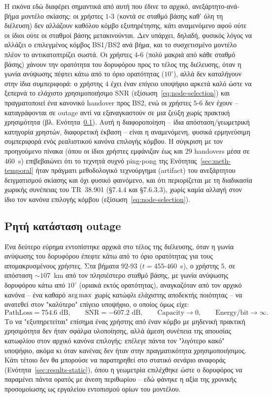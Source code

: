 Η εικόνα εδώ διαφέρει σημαντικά από αυτή που έδινε το αρχικό,
ανεξάρτητο-ανά-βήμα μοντέλο σκίασης: οι χρήστες $1$-$3$ (κοντά σε σταθμό
βάσης καθ' όλη τη διέλευση) δεν αλλάζουν καθόλου κόμβο εξυπηρέτησης, κάτι
αναμενόμενο αφού ούτε οι ίδιοι ούτε οι σταθμοί βάσης μετακινούνται. Δεν
υπάρχει, δηλαδή, φυσικός λόγος να αλλάζει ο επιλεγμένος κόμβος BS1/BS2 ανά βήμα, και
το συσχετισμένο μοντέλο πλέον το αντικατοπτρίζει σωστά. Οι χρήστες $4$-$6$
(πολύ μακριά από κάθε σταθμό βάσης) χάνουν την ορατότητα του δορυφόρου
προς το τέλος της διέλευσης, όταν η γωνία ανύψωσης πέφτει κάτω από το όριο
ορατότητας ($10^\circ$), αλλά δεν καταλήγουν στην ίδια συμπεριφορά: ο
χρήστης $4$ έχει έναν επίγειο υποψήφιο αρκετά καλό ώστε να ξεπερνά το
ελάχιστο χρησιμοποιήσιμο SNR (εξίσωση~\eqref{eq:node-selection}) και
πραγματοποιεί ένα κανονικό handover προς BS2, ενώ οι χρήστες $5$-$6$ δεν
έχουν -- καταγράφονται σε outage αντί να εξαναγκαστούν σε μια ζεύξη χωρίς
πρακτική χρησιμότητα (βλ. Ενότητα~\ref{subsec:results-outage}). Αυτή η
διαφοροποίηση -- ίδια απόσταση/γεωμετρική κατηγορία χρηστών, διαφορετική
έκβαση -- είναι η αναμενόμενη, φυσικά ερμηνεύσιμη συμπεριφορά ενός
ρεαλιστικού κανόνα επιλογής κόμβου. Η σύγκριση με τον προηγούμενο
πίνακα (όπου οι ίδιοι χρήστες εμφάνιζαν έως και $29$ handovers μέσα σε
$460$~s) επιβεβαιώνει ότι το τεχνητά συχνό ping-pong της
Ενότητας~\ref{sec:meth-temporal} ήταν πράγματι μεθοδολογικό τεχνούργημα
(artifact) του ανεξάρτητου δειγματισμού σκίασης και όχι φυσικό φαινόμενο,
και ότι περιορίζεται με τη διαδικασία χωρικής συνέπειας του TR~38.901
(§7.4.4 και §7.6.3.3), χωρίς καμία αλλαγή στον ίδιο τον κανόνα επιλογής
κόμβου (εξίσωση~\eqref{eq:node-selection}).

\subsection{Ρητή κατάσταση outage}
\label{subsec:results-outage}

Ένα δεύτερο εύρημα εντοπίστηκε αρχικά στο τέλος της διέλευσης, όταν η
γωνία ανύψωσης του δορυφόρου έπεφτε κάτω από το όριο ορατότητας για τους
απομακρυσμένους χρήστες. Στα βήματα $92$-$93$ ($t = 455$-$460$~s), ο
χρήστης $5$, σε απόσταση $\sim\!107$~km από τον πλησιέστερο σταθμό
βάσης, με γωνία ανύψωσης δορυφόρου κάτω από $10^\circ$ (οριακά εκτός
ορατότητας), αναγκαζόταν από τον αρχικό κανόνα -- ένα καθαρό $\operatorname*{arg\,max}$
χωρίς κατώφλι ελάχιστης αποδεκτής ποιότητας -- να ανατεθεί στον
"καλύτερο" επίγειο υποψήφιο, ο οποίος όμως είχε:
\[
\text{PathLoss} = 754.6\text{~dB}, \qquad \text{SNR} = -607.2\text{~dB},
\qquad \text{Capacity} \to 0, \qquad \text{Energy/bit} \to \infty.
\]
Το να "εξυπηρετείται" επίσημα ένας χρήστης από έναν κόμβο με μηδενική
πρακτική χρησιμότητα δεν ήταν σφάλμα υλοποίησης, αλλά άμεση συνέπεια της
απουσίας κατωφλίου στον αρχικό κανόνα επιλογής: επέλεγε πάντα τον
"λιγότερο κακό" υποψήφιο, ακόμα κι όταν κανένας δεν ήταν στην
πραγματικότητα χρησιμοποιήσιμος. Κάτι τέτοιο δεν θα μπορούσε να
παρατηρηθεί στο στατικό σενάριο αναφοράς (Ενότητα~\ref{sec:results-static}),
όπου η γεωμετρία επιλέχθηκε ώστε ο δορυφόρος να παραμένει πάντα ορατός με
άνεση περιθωρίου -- εδώ φάνηκε η αξία της χρονικής προσομοίωσης ως
εργαλείου εντοπισμού ορίων του μοντέλου.


